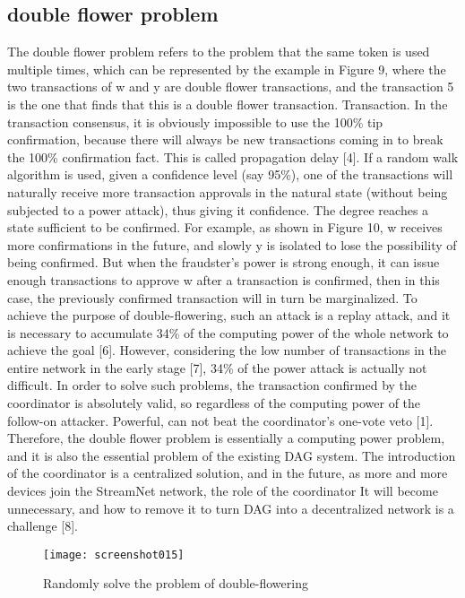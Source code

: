 \documentclass{article}
\begin{document}
\subsection{double flower problem}
The double flower problem refers to the problem that the same token is used multiple times, which can be represented by the example in Figure 9, where the two transactions of w and y are double flower transactions, and the transaction 5 is the one that finds that this is a double flower transaction. Transaction. In the transaction consensus, it is obviously impossible to use the 100\% tip confirmation, because there will always be new transactions coming in to break the 100\% confirmation fact. This is called propagation delay [4]. If a random walk algorithm is used, given a confidence level (say 95\%), one of the transactions will naturally receive more transaction approvals in the natural state (without being subjected to a power attack), thus giving it confidence. The degree reaches a state sufficient to be confirmed. For example, as shown in Figure 10, w receives more confirmations in the future, and slowly y is isolated to lose the possibility of being confirmed. But when the fraudster's power is strong enough, it can issue enough transactions to approve w after a transaction is confirmed, then in this case, the previously confirmed transaction will in turn be marginalized. To achieve the purpose of double-flowering, such an attack is a replay attack, and it is necessary to accumulate 34\% of the computing power of the whole network to achieve the goal [6]. However, considering the low number of transactions in the entire network in the early stage [7], 34\% of the power attack is actually not difficult. In order to solve such problems, the transaction confirmed by the coordinator is absolutely valid, so regardless of the computing power of the follow-on attacker. Powerful, can not beat the coordinator's one-vote veto [1]. \\ 
\indent Therefore, the double flower problem is essentially a computing power problem, and it is also the essential problem of the existing DAG system. The introduction of the coordinator is a centralized solution, and in the future, as more and more devices join the StreamNet network, the role of the coordinator It will become unnecessary, and how to remove it to turn DAG into a decentralized network is a challenge [8].

\begin{figure}[H]
	\centering
	\texttt{[image: screenshot015]}
	\caption{Randomly solve the problem of double-flowering}
	\label{simulationfigure}
\end{figure}
\end{document}
